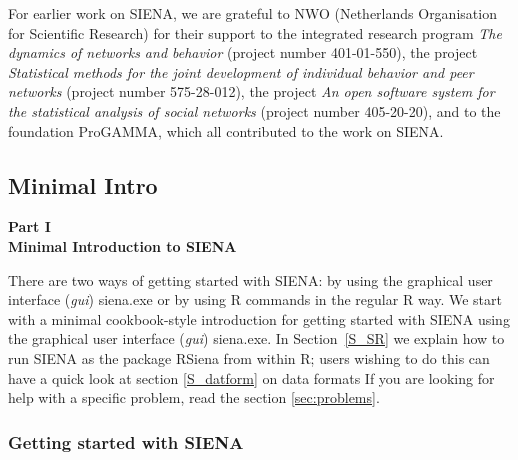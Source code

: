 \documentclass[a4paper,fleqn]{article}
\newcommand{\+}{\, + \,}
\newcommand{\R}{{\sf R }}
\newcommand{\Rn}{{\sf R}}
\newcommand{\RS}{{\sf RSiena }}
\newcommand{\SI}{{\sf SIENA }}
\newcommand{\si}{{\sf SIENA}}
\begin{document}
For earlier work on \si, we are grateful to NWO (Netherlands Organisation for
Scientific Research) for their support to the integrated research program
\emph{The dynamics of networks and behavior} (project number 401-01-550),
the project \emph{Statistical methods for the joint development of
individual behavior and peer networks} (project number 575-28-012),
the project \emph{An open software system for the statistical
analysis of social networks} (project number 405-20-20),
and to the foundation ProGAMMA,
which all contributed to the work on \si.

\newpage
\begin{print}
\part{Minimal Intro}
\end{print}
\begin{screen}
{\color{section0}\LARGE\bf\noindent
Part I\\[1.5ex] Minimal Introduction to \SI  \\[1.8ex]}
\end{screen}
There are two ways of getting started with \si:
by using the  graphical user interface (\emph{gui}) {siena.exe}
or by using \R commands in the regular \R way.
We start with a minimal cookbook-style
introduction for getting started with \SI using
the graphical user interface (\emph{gui}) {siena.exe}. In Section~\ref{S_SR}
we explain how to run \SI
as the package \RS from within \Rn;
users wishing to do this can have a quick look at section
\ref{S_datform} on data formats
If you are looking for help with a specific problem, read
the section \ref{sec:problems}.

\section{Getting started with \SI}
\label{S_minsi1}
\end{document}
